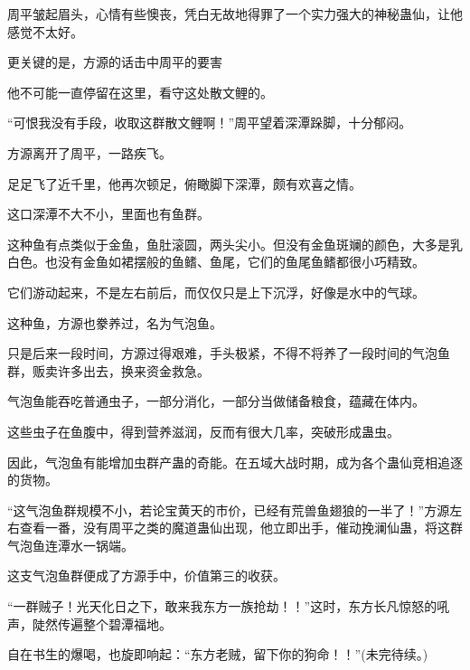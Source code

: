 \begin{this_body}
周平皱起眉头，心情有些懊丧，凭白无故地得罪了一个实力强大的神秘蛊仙，让他感觉不太好。

更关键的是，方源的话击中周平的要害

他不可能一直停留在这里，看守这处散文鲤的。

“可恨我没有手段，收取这群散文鲤啊！”周平望着深潭跺脚，十分郁闷。

方源离开了周平，一路疾飞。

足足飞了近千里，他再次顿足，俯瞰脚下深潭，颇有欢喜之情。

这口深潭不大不小，里面也有鱼群。

这种鱼有点类似于金鱼，鱼肚滚圆，两头尖小。但没有金鱼斑斓的颜色，大多是乳白色。也没有金鱼如裙摆般的鱼鳍、鱼尾，它们的鱼尾鱼鳍都很小巧精致。

它们游动起来，不是左右前后，而仅仅只是上下沉浮，好像是水中的气球。

这种鱼，方源也豢养过，名为气泡鱼。

只是后来一段时间，方源过得艰难，手头极紧，不得不将养了一段时间的气泡鱼群，贩卖许多出去，换来资金救急。

气泡鱼能吞吃普通虫子，一部分消化，一部分当做储备粮食，蕴藏在体内。

这些虫子在鱼腹中，得到营养滋润，反而有很大几率，突破形成蛊虫。

因此，气泡鱼有能增加虫群产蛊的奇能。在五域大战时期，成为各个蛊仙竞相追逐的货物。

“这气泡鱼群规模不小，若论宝黄天的市价，已经有荒兽鱼翅狼的一半了！”方源左右查看一番，没有周平之类的魔道蛊仙出现，他立即出手，催动挽澜仙蛊，将这群气泡鱼连潭水一锅端。

这支气泡鱼群便成了方源手中，价值第三的收获。

“一群贼子！光天化日之下，敢来我东方一族抢劫！！”这时，东方长凡惊怒的吼声，陡然传遍整个碧潭福地。

自在书生的爆喝，也旋即响起：“东方老贼，留下你的狗命！！”(未完待续。)

\end{this_body}

